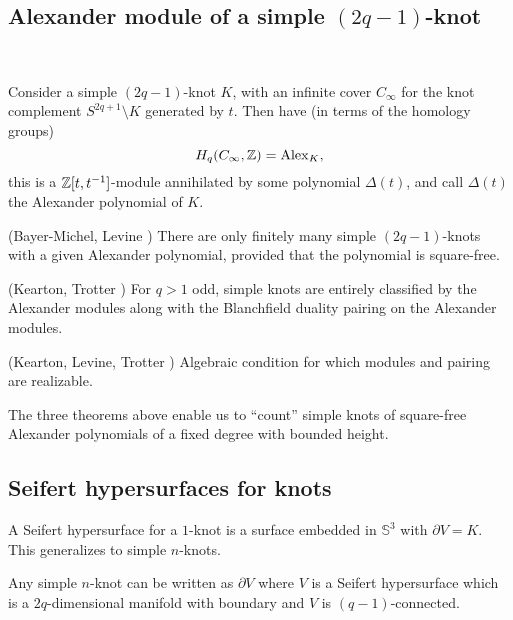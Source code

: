 \documentclass[12pt,amsfont]{amsart}
\begin{document}
\subsection{Alexander module of a simple $(2q-1)$-knot}
{\ }

Consider a simple $(2q-1)$-knot $K$, with an infinite cover $C_\infty$ for the knot complement $S^{2q+1} \setminus K$ generated by $t$. Then have (in terms of the homology groups)
\[
H_q(C_\infty, {\mathbb Z}) = \operatorname{Alex}_K,
\]
this is a ${\mathbb Z}[t, t^{-1}]$-module annihilated by some polynomial $\Delta(t)$, and call $\Delta(t)$ the Alexander polynomial of $K$. 

\begin{thm} (Bayer-Michel, Levine ) There are only finitely many simple $(2q-1)$-knots with a given Alexander polynomial, provided that the polynomial is square-free.
\end{thm}
\begin{thm} (Kearton, Trotter )
For $q > 1$ odd, simple knots are entirely classified by the Alexander modules along with the Blanchfield duality pairing on the Alexander modules. 
\end{thm}

\begin{thm} (Kearton, Levine, Trotter ) 
Algebraic condition for which modules and pairing are realizable. 
\end{thm}

The three theorems above enable us to ``count'' simple knots of square-free Alexander polynomials of a fixed degree with bounded height.

\subsection{Seifert hypersurfaces for knots}
\begin{dfn}
A Seifert hypersurface for a $1$-knot is a surface embedded in $\mathbb{S}^3$ with $\partial V = K$. This generalizes to simple $n$-knots. 
\end{dfn}

\begin{thm} Any simple $n$-knot can be written as $\partial V$ where $V$ is a Seifert hypersurface which is a $2q$-dimensional manifold with boundary and $V$ is $(q-1)$-connected. 
\end{thm}
\end{document}
